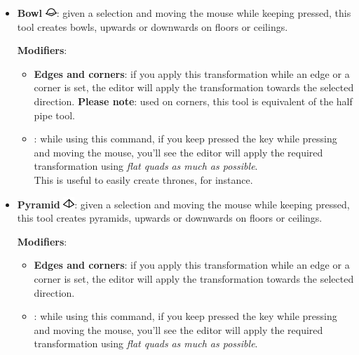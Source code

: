 \begin{itemize}
    \item \textbf{Bowl} \includegraphics[scale=0.5]{Resources/icons_toolbox/toolbox_GroupBowl-16.png}: given a selection and moving the mouse while keeping  pressed, this tool creates bowls, upwards or downwards on floors or ceilings.
    \par \textbf{Modifiers}:
    \begin{itemize}
        \item \textbf{Edges and corners}: if you apply this transformation while an edge or a corner is set, the editor will apply the transformation towards the selected direction. \textbf{Please note}: used on corners, this tool is equivalent of the half pipe tool.
        \item \keys{\Alt}: while using this command, if you keep pressed the \keys{\Alt} key while pressing  and moving the mouse, you'll see the editor will apply the required transformation using \emph{flat quads} \emph{as much as possible}. \\ This is useful to easily create thrones, for instance. 
    \end{itemize}
    
    \item \textbf{Pyramid} \includegraphics[scale=0.5]{Resources/icons_toolbox/toolbox_GroupPyramid-16.png}: given a selection and moving the mouse while keeping  pressed, this tool creates pyramids, upwards or downwards on floors or ceilings.
    \par \textbf{Modifiers}:
    \begin{itemize}
        \item \textbf{Edges and corners}: if you apply this transformation while an edge or a corner is set, the editor will apply the transformation towards the selected direction.
        \item \keys{\Alt}: while using this command, if you keep pressed the \keys{\Alt} key while pressing  and moving the mouse, you'll see the editor will apply the required transformation using \emph{flat quads} \emph{as much as possible}.
    \end{itemize}


\end{itemize}

